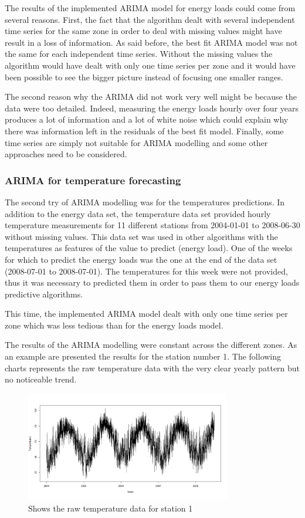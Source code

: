 \documentclass{article} %
\begin{document}
The results of the implemented ARIMA model for energy loads could come from several reasons. First, the fact that the algorithm dealt with several independent time series for the same zone in order to deal with missing values might have result in a loss of information. As said before, the best fit ARIMA model was not the same for each independent time series. Without the missing values the algorithm would have dealt with only one time series per zone and it would have been possible to see the bigger picture instead of focusing one smaller ranges.

The second reason why the ARIMA did not work very well might be because the data were too detailed. Indeed, measuring the energy loads hourly over four years produces a lot of information and a lot of white noise which could explain why there was information left in the residuals of the best fit model. Finally, some time series are simply not suitable for ARIMA modelling and some other approaches need to be considered.


\subsubsection*{ARIMA for temperature forecasting}

The second try of ARIMA modelling was for the temperatures predictions. In addition to the energy data set, the temperature data set provided hourly temperature measurements for 11 different stations from 2004-01-01 to 2008-06-30 without missing values. This data set was used in other algorithms with the temperatures as features of the value to predict (energy load). One of the weeks for which to predict the energy loads was the one at the end of the data set (2008-07-01 to 2008-07-01). The temperatures for this week were not provided, thus it was necessary to predicted them in order to pass them to our energy loads predictive algorithms.

This time, the implemented ARIMA model dealt with only one time series per zone which was less tedious than for the energy loads model.

The results of the ARIMA modelling were constant across the different zones. As an example are presented the results for the station number 1.
The following charts represents the raw temperature data with the very clear yearly pattern but no noticeable trend.

\begin{figure}
  \centering
    \includegraphics[width=0.80\textwidth]{TempRawData}
  \caption{Shows the raw temperature data for station 1 }
\end{figure}
\end{document}
